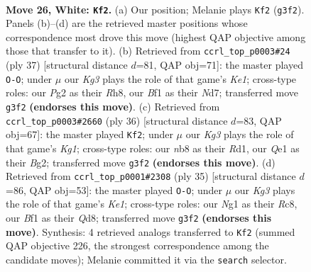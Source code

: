 \documentclass[11pt]{article}
\begin{document}
\clearpage

\begin{figure}[p]\centering
\begin{subfigure}{0.46\textwidth}\centering
\resizebox{\linewidth}{!}{%
\newchessgame
\chessboard[
  setfen={1n3rk1/1rqb1ppp/8/4Pp2/p1p2P2/6K1/PPP3PP/1R2QBNR w - - 6 26},
  showmover=false,
  pgfstyle=straightmove, color=movearrow, markmove={g3-f2}
]}
\caption{}
\end{subfigure}\hfill
\begin{subfigure}{0.46\textwidth}\centering
\resizebox{\linewidth}{!}{%
\newchessgame
\chessboard[
  setfen={r3k2r/1p1nbp1p/1q2p3/4P3/1pB1NPP1/4p1K1/P1Q4P/R6R b kq - 3 19},
  showmover=false,
  pgfstyle=straightmove, color=movearrow, markmove={e8-g8}
]}
\caption{}
\end{subfigure}
\\[4pt]
\begin{subfigure}{0.46\textwidth}\centering
\resizebox{\linewidth}{!}{%
\newchessgame
\chessboard[
  setfen={4qrk1/1ppb1pp1/r2p4/3P3p/1p3P2/6P1/PP1QP1BP/R2R2K1 w - - 1 19},
  showmover=false,
  pgfstyle=straightmove, color=movearrow, markmove={g1-f2}
]}
\caption{}
\end{subfigure}\hfill
\begin{subfigure}{0.46\textwidth}\centering
\resizebox{\linewidth}{!}{%
\newchessgame
\chessboard[
  setfen={2rqk2r/4p1b1/p5p1/1bpP1p1p/1p3P2/4BQ2/PPP2NPP/3RR1K1 b k - 1 18},
  showmover=false,
  pgfstyle=straightmove, color=movearrow, markmove={e8-g8}
]}
\caption{}
\end{subfigure}
\caption{\textbf{Move 26, White: \texttt{Kf2}.} (a) Our position; Melanie plays \texttt{Kf2} (\texttt{g3f2}). Panels (b)--(d) are the retrieved master positions whose correspondence most drove this move (highest QAP objective among those that transfer to it). (b) Retrieved from \texttt{ccrl\_top\_p0003\#24} (ply 37) [structural distance $d$=81, QAP obj=71]: the master played \texttt{O-O}; under $\mu$ our \emph{Kg3} plays the role of that game's \emph{Ke1}; cross-type roles: our \emph{P}g2 as their \emph{R}h8, our \emph{B}f1 as their \emph{N}d7; transferred move \texttt{g3f2} \textbf{(endorses this move)}. (c) Retrieved from \texttt{ccrl\_top\_p0003\#2660} (ply 36) [structural distance $d$=83, QAP obj=67]: the master played \texttt{Kf2}; under $\mu$ our \emph{Kg3} plays the role of that game's \emph{Kg1}; cross-type roles: our \emph{n}b8 as their \emph{R}d1, our \emph{Q}e1 as their \emph{B}g2; transferred move \texttt{g3f2} \textbf{(endorses this move)}. (d) Retrieved from \texttt{ccrl\_top\_p0001\#2308} (ply 35) [structural distance $d$=86, QAP obj=53]: the master played \texttt{O-O}; under $\mu$ our \emph{Kg3} plays the role of that game's \emph{Ke1}; cross-type roles: our \emph{N}g1 as their \emph{R}c8, our \emph{B}f1 as their \emph{Q}d8; transferred move \texttt{g3f2} \textbf{(endorses this move)}. Synthesis: 4 retrieved analogs transferred to \texttt{Kf2} (summed QAP objective 226, the strongest correspondence among the candidate moves); Melanie committed it via the \texttt{search} selector.}
\label{fig:thought-m50}
\end{figure}
\end{document}
